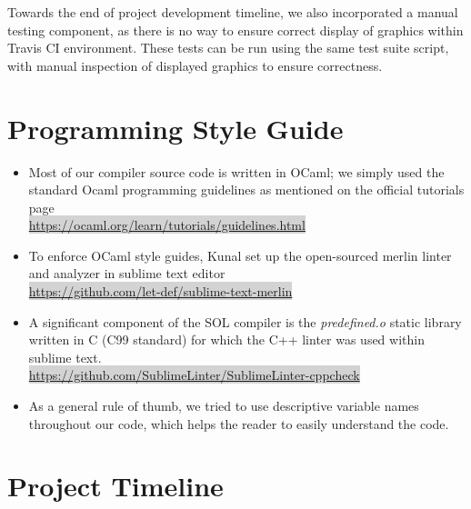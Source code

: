 \documentclass[letterpaper,12pt]{report}
\begin{document}
{      Towards the end of project development timeline, we also incorporated a manual testing component, as there is no way to ensure correct display of graphics within Travis CI environment. These tests can be run using the same test suite script, with manual inspection of displayed graphics to ensure correctness.\\

  \section{Programming Style Guide}
    \begin{itemize}
      \itemsep 0em
      \item Most of our compiler source code is written in OCaml; we simply used the standard Ocaml programming guidelines as mentioned on the official tutorials page\\
      \colorbox{lightgray}{\href{https://ocaml.org/learn/tutorials/guidelines.html}{https://ocaml.org/learn/tutorials/guidelines.html}}

      \item To enforce OCaml style guides, Kunal set up the open-sourced merlin linter and analyzer in sublime text editor\\
      \colorbox{lightgray}{\href{https://github.com/let-def/sublime-text-merlin}{https://github.com/let-def/sublime-text-merlin}}

      \item A significant component of the SOL compiler is the \textit{predefined.o} static library written in C (C99 standard) for which the C++ linter was used within sublime text.\\
      \colorbox{lightgray}{\href{ https://github.com/SublimeLinter/SublimeLinter-cppcheck}{ https://github.com/SublimeLinter/SublimeLinter-cppcheck}}

      \item As a general rule of thumb, we tried to use descriptive variable names throughout our code, which helps the reader to easily understand the code.
    \end{itemize}

  \section{Project Timeline}
}
\end{document}
